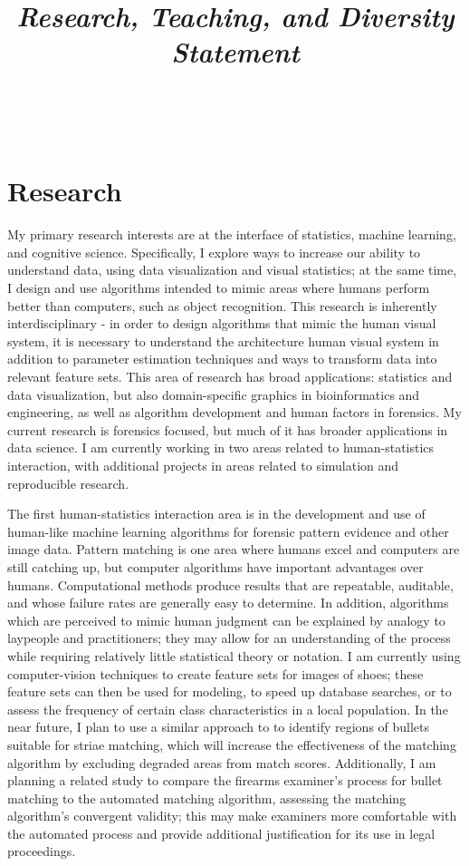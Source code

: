 \documentclass[12pt, letterpaper, sans]{moderncv}
\title{\emph{Research, Teaching, and Diversity Statement}}
\makeatletter
\newcommand{\makesimpletitle}{%
  \recomputeletterlengths%

  \begin{varwidth}[c]{.75\textwidth}
  \if@left\raggedright\fi%
      \if@right\raggedleft\fi%
      \ifthenelse{\equal{\@title}{}}{}{\titlestyle{\@title}}%
  \end{varwidth}\hfill
  \begin{varwidth}[c]{.25\textwidth}%
      \raggedleft%
      \addressfont\textcolor{color2}{%
        {\bfseries\upshape\@firstname~\@lastname}\\
        \ifthenelse{\isundefined{\@addressstreet}}{}{\makenewline\addresssymbol\@addressstreet%
          \ifthenelse{\equal{\@addresscity}{}}{}{\makenewline\@addresscity}%
          \ifthenelse{\equal{\@addresscountry}{}}{}{\makenewline\@addresscountry}}%
        \collectionloop{phones}{%
          \makenewline\csname\collectionloopkey phonesymbol\endcsname\collectionloopitem}%
        \ifthenelse{\isundefined{\@email}}{}{\makenewline\emailsymbol\emaillink{\@email}}%
        \ifthenelse{\isundefined{\@homepage}}{}{\makenewline\homepagesymbol\httplink{\@homepage}}%
        \ifthenelse{\isundefined{\@extrainfo}}{}{\makenewline\@extrainfo}}
    \end{varwidth}
}
\makeatother
\begin{document}
\makesimpletitle

\section{Research}

My primary research interests are at the interface of statistics, machine learning, and cognitive science. Specifically, I explore ways to increase our ability to understand data, using data visualization and visual statistics; at the same time, I design and use algorithms intended to mimic areas where humans perform better than computers, such as object recognition. This research is inherently interdisciplinary - in order to design algorithms that mimic the human visual system, it is necessary to understand the architecture human visual system in addition to parameter estimation techniques and ways to transform data into relevant feature sets. This area of research has broad applications: statistics and data visualization, but also domain-specific graphics in bioinformatics and engineering, as well as algorithm development and human factors in forensics. My current research is forensics focused, but much of it has broader applications in data science. I am currently working in two areas related to human-statistics interaction, with additional projects in areas related to simulation and reproducible research. 

The first human-statistics interaction area is in the development and use of human-like machine learning algorithms for forensic pattern evidence and other image data. Pattern matching is one area where humans excel and computers are still catching up, but computer algorithms have important advantages over humans. Computational methods produce results that are repeatable, auditable, and whose failure rates are generally easy to determine. In addition, algorithms which are perceived to mimic human judgment can be explained by analogy to laypeople and practitioners; they may allow for an understanding of the process while requiring relatively little statistical theory or notation. I am currently using computer-vision techniques to create feature sets for images of shoes; these feature sets can then be used for modeling, to speed up database searches, or to assess the frequency of certain class characteristics in a local population. In the near future, I plan to use a similar approach to to identify regions of bullets suitable for striae matching, which will increase the effectiveness of the matching algorithm by excluding degraded areas from match scores. Additionally, I am planning a related study to compare the firearms examiner's process for bullet matching to the automated matching algorithm, assessing the matching algorithm's convergent validity; this may make examiners more comfortable with the automated process and provide additional justification for its use in legal proceedings. 
\end{document}
